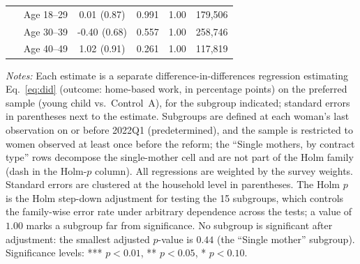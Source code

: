 \begin{table}[H]
{\begin{tabular}{lcccc}
$\quad$ Age 18--29 & 0.01$^{}$ (0.87) & 0.991 & 1.00 & 179,506 \\
$\quad$ Age 30--39 & -0.40$^{}$ (0.68) & 0.557 & 1.00 & 258,746 \\
$\quad$ Age 40--49 & 1.02$^{}$ (0.91) & 0.261 & 1.00 & 117,819 \\
\bottomrule\end{tabular}}
\par\vspace{3pt}\footnotesize\raggedright \textit{Notes:} Each estimate is a separate difference-in-differences regression estimating Eq.~\eqref{eq:did} (outcome: home-based work, in percentage points) on the preferred sample (young child vs.\ Control~A), for the subgroup indicated; standard errors in parentheses next to the estimate. Subgroups are defined at each woman's last observation on or before 2022Q1 (predetermined), and the sample is restricted to women observed at least once before the reform; the ``Single mothers, by contract type'' rows decompose the single-mother cell and are not part of the Holm family (dash in the Holm-$p$ column). All regressions are weighted by the survey weights. Standard errors are clustered at the household level in parentheses. The Holm $p$ is the Holm step-down adjustment for testing the 15 subgroups, which controls the family-wise error rate under arbitrary dependence across the tests; a value of $1.00$ marks a subgroup far from significance. No subgroup is significant after adjustment: the smallest adjusted $p$-value is $0.44$ (the ``Single mother'' subgroup). Significance levels: *** $p<0.01$, ** $p<0.05$, * $p<0.10$.
\end{table}
